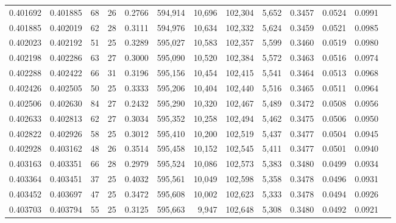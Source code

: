 \begin{tabular}{rrrrrrrrrrrrr}
0.401692 & 0.401885 &    68 &  26 &                                     0.2766 & 594,914 &  10,696 & 102,304 &   5,652 & 0.3457 & 0.0524 & 0.0991 \\
0.401885 & 0.402019 &    62 &  28 &                                     0.3111 & 594,976 &  10,634 & 102,332 &   5,624 & 0.3459 & 0.0521 & 0.0985 \\
0.402023 & 0.402192 &    51 &  25 &                                     0.3289 & 595,027 &  10,583 & 102,357 &   5,599 & 0.3460 & 0.0519 & 0.0980 \\
0.402198 & 0.402286 &    63 &  27 &                                     0.3000 & 595,090 &  10,520 & 102,384 &   5,572 & 0.3463 & 0.0516 & 0.0974 \\
0.402288 & 0.402422 &    66 &  31 &                                     0.3196 & 595,156 &  10,454 & 102,415 &   5,541 & 0.3464 & 0.0513 & 0.0968 \\
0.402426 & 0.402505 &    50 &  25 &                                     0.3333 & 595,206 &  10,404 & 102,440 &   5,516 & 0.3465 & 0.0511 & 0.0964 \\
0.402506 & 0.402630 &    84 &  27 &                                     0.2432 & 595,290 &  10,320 & 102,467 &   5,489 & 0.3472 & 0.0508 & 0.0956 \\
0.402633 & 0.402813 &    62 &  27 &                                     0.3034 & 595,352 &  10,258 & 102,494 &   5,462 & 0.3475 & 0.0506 & 0.0950 \\
0.402822 & 0.402926 &    58 &  25 &                                     0.3012 & 595,410 &  10,200 & 102,519 &   5,437 & 0.3477 & 0.0504 & 0.0945 \\
0.402928 & 0.403162 &    48 &  26 &                                     0.3514 & 595,458 &  10,152 & 102,545 &   5,411 & 0.3477 & 0.0501 & 0.0940 \\
0.403163 & 0.403351 &    66 &  28 &                                     0.2979 & 595,524 &  10,086 & 102,573 &   5,383 & 0.3480 & 0.0499 & 0.0934 \\
0.403364 & 0.403451 &    37 &  25 &                                     0.4032 & 595,561 &  10,049 & 102,598 &   5,358 & 0.3478 & 0.0496 & 0.0931 \\
0.403452 & 0.403697 &    47 &  25 &                                     0.3472 & 595,608 &  10,002 & 102,623 &   5,333 & 0.3478 & 0.0494 & 0.0926 \\
0.403703 & 0.403794 &    55 &  25 &                                     0.3125 & 595,663 &   9,947 & 102,648 &   5,308 & 0.3480 & 0.0492 & 0.0921 \\

\end{tabular}
